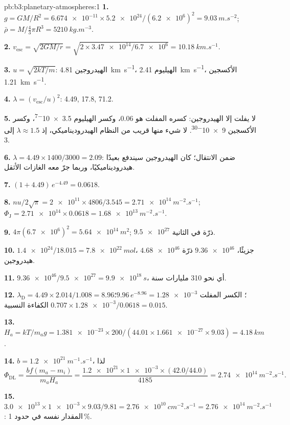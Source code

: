 \begin{solution}{pb:b3:planetary-atmospheres:1}
\textbf{1.} $g = GM/R^2 = \num{6.674e-11}\times\num{5.2e24}/(\num{6.2e6})^2 =
\qty{9.03}{m.s^{-2}}$; $\bar\rho = M/\tfrac43\pi R^3 = \qty{5210}{kg.m^{-3}}$.

\textbf{2.} $v_\mathrm{esc} = \sqrt{2GM/r} = \sqrt{2\times\num{3.47e14}/\num{6.7e6}}
= \qty{10.18}{km.s^{-1}}$.

\textbf{3.} $u = \sqrt{2kT/m}$: الهيدروجين \qty{4.81}{km.s^{-1}}، الهيليوم
\qty{2.41}{km.s^{-1}}، الأكسجين \qty{1.21}{km.s^{-1}}.

\textbf{4.} $\lambda = (v_\mathrm{esc}/u)^2$: 4.49, 17.8, 71.2.

\textbf{5.} لا يفلت إلا الهيدروجين: كسره المفلت هو 0.06، وكسر الهيليوم
\num{3.5e-7}، وكسر الأكسجين \num{9e-30}. لا شيء منها قريب من النظام الهيدروديناميكي،
إذ $\lambda \approx 1.5$ إلى 3.

\textbf{6.} $\lambda = 4.49\times1400/3000 = 2.09$: ضمن الانتقال؛
كان الهيدروجين سيندفع بعيدًا هيدروديناميكيًا، وربما جرّ معه
الغازات الأثقل.

\textbf{7.} $(1 + 4.49)\,e^{-4.49} = 0.0618$.

\textbf{8.} $n u/2\sqrt\pi = \num{2e11}\times4806/3.545 = \qty{2.71e14}{m^{-2}.s^{-1}}$;
$\Phi_\mathrm J = \num{2.71e14}\times0.0618 = \qty{1.68e13}{m^{-2}.s^{-1}}$.

\textbf{9.} $4\pi(\num{6.7e6})^2 = \qty{5.64e14}{m^2}$; $\num{9.5e27}$ ذرّة في
الثانية.

\textbf{10.} $\num{1.4e24}/18.015 = \qty{7.8e22}{mol}$، $\num{4.68e46}$ جزيئًا،
$\num{9.36e46}$ ذرّة هيدروجين.

\textbf{11.} $\num{9.36e46}/\num{9.5e27} = \qty{9.9e18}{s}$، أي نحو 310 مليارات
سنة.

\textbf{12.} $\lambda_\mathrm D = 4.49\times2.014/1.008 = 8.96$؛ الكسر المفلت
$9.96\,e^{-8.96} = \num{1.28e-3}$؛ الكفاءة النسبية $0.707\times
\num{1.28e-3}/0.0618 = 0.015$.

\textbf{13.} $H_a = kT/m_a g = \num{1.381e-23}\times200/(44.01\times\num{1.661e-27}
\times9.03) = \qty{4.18}{km}$.

\textbf{14.} $b = \qty{1.2e21}{m^{-1}.s^{-1}}$، لذا
\[
\Phi_\mathrm{DL} = \frac{b f(m_a - m_i)}{m_a H_a}
= \frac{\num{1.2e21}\times\num{1e-3}\times(42.0/44.0)}{4185}
= \qty{2.74e14}{m^{-2}.s^{-1}}.
\]

\textbf{15.} $\num{3.0e13}\times\num{1e-3}\times9.03/9.81 =
\qty{2.76e10}{cm^{-2}.s^{-1}} = \qty{2.76e14}{m^{-2}.s^{-1}}$: المقدار نفسه
في حدود 1\,\%.


\end{solution}
